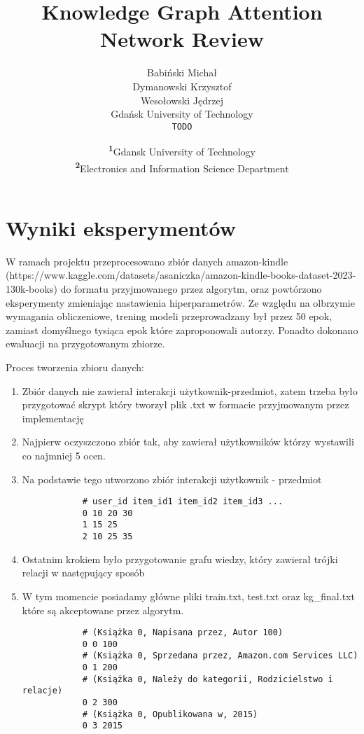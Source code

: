 \documentclass[a4paper]{LTJournalArticle}
\title{Knowledge Graph Attention Network Review}
\author{Babiński Michał \\
        Dymanowski Krzysztof \\
        Wesołowski Jędrzej \\
        Gdańsk University of Technology \\
        \texttt{TODO}}
\date{\footnotesize\textsuperscript{\textbf{1}}Gdansk University of Technology\\ \textsuperscript{\textbf{2}}Electronics and Information Science Department}
\begin{document}
	
	\maketitle %
	

	\section{Wyniki eksperymentów}
	W ramach projektu przeprocesowano zbiór danych amazon-kindle (https://www.kaggle.com/datasets/asaniczka/amazon-kindle-books-dataset-2023-130k-books) do formatu przyjmowanego przez algorytm, oraz powtórzono eksperymenty zmieniając nastawienia hiperparametrów. Ze względu na olbrzymie wymagania obliczeniowe, trening modeli przeprowadzany był przez 50 epok, zamiast domyślnego tysiąca epok które zaproponowali autorzy. Ponadto dokonano ewaluacji na przygotowanym zbiorze.
	
	
	Proces tworzenia zbioru danych:
	\begin{enumerate}
		\item Zbiór danych nie zawierał interakcji użytkownik-przedmiot, zatem trzeba było przygotować skrypt który tworzył plik .txt w formacie przyjmowanym przez implementację
		
		\item Najpierw oczyszczono zbiór tak, aby zawierał użytkowników którzy wystawili co najmniej 5 ocen.
		
		\item Na podstawie tego utworzono zbiór interakcji użytkownik - przedmiot  
		
		\begin{verbatim}
			# user_id item_id1 item_id2 item_id3 ...
			0 10 20 30
			1 15 25
			2 10 25 35
		\end{verbatim}

	
		\item Ostatnim krokiem było przygotowanie grafu wiedzy, który zawierał trójki relacji w następujący sposób  

	
		\item W tym momencie posiadamy główne pliki train.txt, test.txt oraz kg\_final.txt które są akceptowane przez algorytm.
		
		\begin{verbatim}
			# (Książka 0, Napisana przez, Autor 100)
			0 0 100   
			# (Książka 0, Sprzedana przez, Amazon.com Services LLC)
			0 1 200   
			# (Książka 0, Należy do kategorii, Rodzicielstwo i relacje)
			0 2 300   
			# (Książka 0, Opublikowana w, 2015)
			0 3 2015  
		\end{verbatim}
	
	\end{enumerate}
\end{document}
